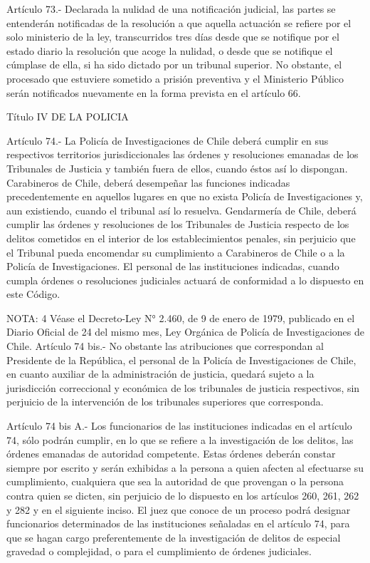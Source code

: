     Artículo 73.- Declarada la nulidad de una notificación judicial, las partes se entenderán notificadas de la resolución a que aquella actuación se refiere por el solo ministerio de la ley, transcurridos tres días desde que se notifique por el estado diario la resolución que acoge la nulidad, o desde que se notifique el cúmplase de ella, si ha sido dictado por un tribunal superior.
    No obstante, el procesado que estuviere sometido a prisión preventiva y el Ministerio Público serán notificados nuevamente en la forma prevista en el artículo 66.

    Título IV
  DE LA POLICIA

    Artículo 74.- La Policía de Investigaciones de Chile deberá cumplir en sus respectivos territorios jurisdiccionales las órdenes y resoluciones emanadas de los Tribunales de Justicia y también fuera de ellos, cuando éstos así lo dispongan.
  Carabineros de Chile, deberá desempeñar las funciones indicadas precedentemente en aquellos lugares en que no exista Policía de Investigaciones y, aun existiendo, cuando el tribunal así lo resuelva.
  Gendarmería de Chile, deberá cumplir las órdenes y resoluciones de los Tribunales de Justicia respecto de los delitos cometidos en el interior de los establecimientos penales, sin perjuicio que el Tribunal pueda encomendar su cumplimiento a Carabineros de Chile o a la Policía de Investigaciones.
  El personal de las instituciones indicadas, cuando cumpla órdenes o resoluciones judiciales actuará de conformidad a lo dispuesto en este Código.



NOTA:  4
    Véase el Decreto-Ley N° 2.460, de 9 de enero de 1979, publicado en el Diario Oficial de 24 del mismo mes, Ley Orgánica de Policía de Investigaciones de Chile.
    Artículo 74 bis.- No obstante las atribuciones que correspondan al Presidente de la República, el personal de la Policía de Investigaciones de Chile, en cuanto auxiliar de la administración de justicia, quedará sujeto a la jurisdicción correccional y económica de los tribunales de justicia respectivos, sin perjuicio de la intervención de los tribunales superiores que corresponda.

    Artículo 74 bis A.- Los funcionarios de las instituciones indicadas en el artículo 74, sólo podrán cumplir, en lo que se refiere a la investigación de los delitos, las órdenes emanadas de autoridad competente.
    Estas órdenes deberán constar siempre por escrito y serán exhibidas a la persona a quien afecten al efectuarse su cumplimiento, cualquiera que sea la autoridad de que provengan o la persona contra quien se dicten, sin perjuicio de lo dispuesto en los artículos 260, 261, 262 y 282 y en el siguiente inciso.
    El juez que conoce de un proceso podrá designar funcionarios determinados de las instituciones señaladas en el artículo 74, para que se hagan cargo preferentemente de la investigación de delitos de especial gravedad o complejidad, o para el cumplimiento de órdenes judiciales.

